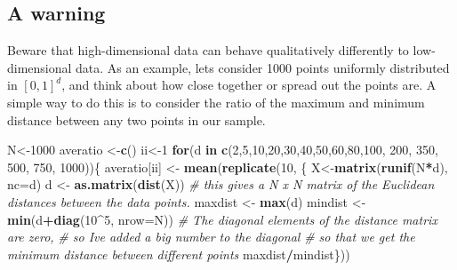 \documentclass[
]{book}
\newenvironment{Shaded}{\begin{snugshade}}{\end{snugshade}}
\newcommand{\AttributeTok}[1]{\textcolor[rgb]{0.13,0.29,0.53}{#1}}
\newcommand{\CommentTok}[1]{\textcolor[rgb]{0.56,0.35,0.01}{\textit{#1}}}
\newcommand{\ControlFlowTok}[1]{\textcolor[rgb]{0.13,0.29,0.53}{\textbf{#1}}}
\newcommand{\DecValTok}[1]{\textcolor[rgb]{0.00,0.00,0.81}{#1}}
\newcommand{\FunctionTok}[1]{\textcolor[rgb]{0.13,0.29,0.53}{\textbf{#1}}}
\newcommand{\NormalTok}[1]{#1}
\newcommand{\OtherTok}[1]{\textcolor[rgb]{0.56,0.35,0.01}{#1}}
\newcommand{\SpecialCharTok}[1]{\textcolor[rgb]{0.81,0.36,0.00}{\textbf{#1}}}
\theoremstyle{definition}
\theoremstyle{definition}
\theoremstyle{definition}
\theoremstyle{definition}
\theoremstyle{remark}
\begin{document}
\subsection*{A warning}\label{a-warning}

Beware that high-dimensional data can behave qualitatively differently to low-dimensional data. As an example, lets consider 1000 points uniformly distributed in \([0,1]^d\), and think about how close together or spread out the points are. A simple way to do this is to consider the ratio of the maximum and minimum distance between any two points in our sample.

\begin{Shaded}
\begin{Highlighting}[]
\NormalTok{N}\OtherTok{\textless{}{-}}\DecValTok{1000}
\NormalTok{averatio }\OtherTok{\textless{}{-}}\FunctionTok{c}\NormalTok{()}
\NormalTok{ii}\OtherTok{\textless{}{-}}\DecValTok{1}
\ControlFlowTok{for}\NormalTok{(d }\ControlFlowTok{in} \FunctionTok{c}\NormalTok{(}\DecValTok{2}\NormalTok{,}\DecValTok{5}\NormalTok{,}\DecValTok{10}\NormalTok{,}\DecValTok{20}\NormalTok{,}\DecValTok{30}\NormalTok{,}\DecValTok{40}\NormalTok{,}\DecValTok{50}\NormalTok{,}\DecValTok{60}\NormalTok{,}\DecValTok{80}\NormalTok{,}\DecValTok{100}\NormalTok{, }\DecValTok{200}\NormalTok{, }\DecValTok{350}\NormalTok{, }\DecValTok{500}\NormalTok{, }\DecValTok{750}\NormalTok{, }\DecValTok{1000}\NormalTok{))\{}
\NormalTok{  averatio[ii] }\OtherTok{\textless{}{-}} \FunctionTok{mean}\NormalTok{(}\FunctionTok{replicate}\NormalTok{(}\DecValTok{10}\NormalTok{, \{}
\NormalTok{  X}\OtherTok{\textless{}{-}}\FunctionTok{matrix}\NormalTok{(}\FunctionTok{runif}\NormalTok{(N}\SpecialCharTok{*}\NormalTok{d), }\AttributeTok{nc=}\NormalTok{d)}
\NormalTok{  d }\OtherTok{\textless{}{-}} \FunctionTok{as.matrix}\NormalTok{(}\FunctionTok{dist}\NormalTok{(X)) }
  \CommentTok{\# this gives a N x N matrix of the Euclidean distances between the data points.}
\NormalTok{  maxdist }\OtherTok{\textless{}{-}} \FunctionTok{max}\NormalTok{(d) }
\NormalTok{  mindist }\OtherTok{\textless{}{-}} \FunctionTok{min}\NormalTok{(d}\SpecialCharTok{+}\FunctionTok{diag}\NormalTok{(}\DecValTok{10}\SpecialCharTok{\^{}}\DecValTok{5}\NormalTok{, }\AttributeTok{nrow=}\NormalTok{N)) }
  \CommentTok{\# The diagonal elements of the distance matrix are zero,}
  \CommentTok{\# so I\textquotesingle{}ve added a big number to the diagonal }
  \CommentTok{\# so that we get the minimum distance between different points}
\NormalTok{  maxdist}\SpecialCharTok{/}\NormalTok{mindist\}))}

\end{Highlighting}
\end{Shaded}
\end{document}
